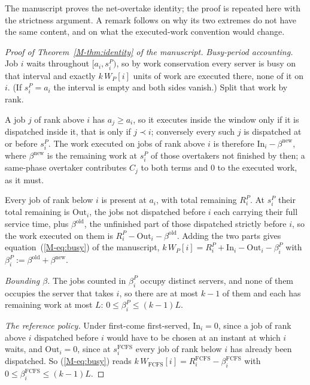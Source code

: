 \documentclass[mathematics,supfile,submit,moreauthors]{Definitions/mdpi}
\begin{document}
The manuscript proves the net-overtake identity; the proof is repeated here with the
strictness argument. A remark follows on why its two extremes do not have the same
content, and on what the executed-work convention would change.

\begin{proof}[Proof of Theorem~\ref*{M-thm:identity} of the manuscript]
\emph{Busy-period accounting.} Job $i$ waits throughout $[a_i, s^P_i)$, so by
work conservation every server is busy on that interval and exactly $k\,W_P[i]$
units of work are executed there, none of it on $i$. (If $s^P_i = a_i$ the
interval is empty and both sides vanish.) Split that work by rank.

A job $j$ of rank above $i$ has $a_j \ge a_i$, so it executes inside the window
only if it is dispatched inside it, that is only if $j \prec i$; conversely every
such $j$ is dispatched at or before $s^P_i$. The work executed on jobs of rank
above $i$ is therefore $\mathrm{In}_i - \beta^{\mathrm{new}}$, where
$\beta^{\mathrm{new}}$ is the remaining work at $s^P_i$ of those overtakers not
finished by then; a same-phase overtaker contributes $C_j$ to both terms and $0$
to the executed work, as it must.

Every job of rank below $i$ is present at $a_i$, with total remaining $R^P_i$.
At $s^P_i$ their total remaining is $\mathrm{Out}_i$, the jobs not dispatched
before $i$ each carrying their full service time, plus $\beta^{\mathrm{old}}$,
the unfinished part of those dispatched strictly before $i$, so the work
executed on them is $R^P_i - \mathrm{Out}_i - \beta^{\mathrm{old}}$. Adding the
two parts gives equation~(\ref*{M-eq:busy}) of the manuscript,
$k\,W_P[i] = R^P_i + \mathrm{In}_i - \mathrm{Out}_i - \beta^P_i$ with
$\beta^P_i := \beta^{\mathrm{old}} + \beta^{\mathrm{new}}$.

\emph{Bounding $\beta$.} The jobs counted in $\beta^P_i$ occupy distinct servers,
and none of them occupies the server that takes $i$, so there are at most $k-1$
of them and each has remaining work at most $L$: $0 \le \beta^P_i \le (k-1)L$.

\emph{The reference policy.} Under first-come first-served,
$\mathrm{In}_i = 0$, since a job of rank above $i$ dispatched before $i$ would
have to be chosen at an instant at which $i$ waits, and
$\mathrm{Out}_i = 0$, since at $s^{\mathrm{FCFS}}_i$ every job of rank below $i$
has already been dispatched. So (\ref*{M-eq:busy}) reads
$k\,W_{\mathrm{FCFS}}[i] = R^{\mathrm{FCFS}}_i - \beta^{\mathrm{FCFS}}_i$ with
$0 \le \beta^{\mathrm{FCFS}}_i \le (k-1)L$.


\end{proof}
\end{document}
